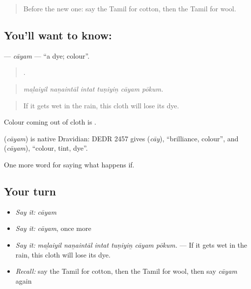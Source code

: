 \label{lesson:TA-C557-cayam}



\begin{quote}
Before the new one: say the Tamil for cotton, then the Tamil for wool.
\end{quote}

\subsection*{You'll want to know: }
\textbf{} — \emph{cāyam} — \textquotedblleft{}a dye; colour\textquotedblright{}.

\begin{quote}
     .
\end{quote}

\begin{quote}
\emph{maḻaiyil naṉaintāl intat tuṇiyiṉ cāyam pōkum.}
\end{quote}

\begin{quote}
If it gets wet in the rain, this cloth will lose its dye.
\end{quote}

Colour coming out of cloth is  .

\begin{cousinweb}
\textbf{} (\emph{cāyam}) is native Dravidian: DEDR 2457 gives  (\emph{cāy}), \textquotedblleft{}brilliance, colour\textquotedblright{}, and  (\emph{cāyam}), \textquotedblleft{}colour, tint, dye\textquotedblright{}.
\end{cousinweb}

\begin{grammarlens}[title={What you've built}]
One more word for saying what happens if.
\end{grammarlens}

\subsection*{Your turn}
\begin{itemize}
\raggedright
  \item \emph{Say it:} \emph{cāyam}
  \item \emph{Say it:} \emph{cāyam}, once more
  \item \emph{Say it:} \emph{maḻaiyil naṉaintāl intat tuṇiyiṉ cāyam pōkum.} — If it gets wet in the rain, this cloth will lose its dye.
  \item \emph{Recall:} say the Tamil for cotton, then the Tamil for wool, then say \emph{cāyam} again
\end{itemize}


